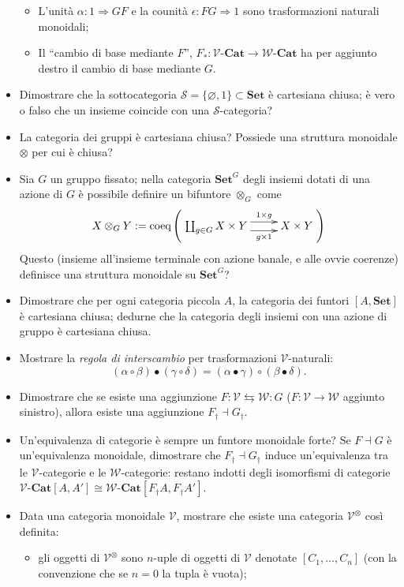 \documentclass[a4paper,10pt]{amsart}
\def\V{\mathcal{V}}
\def\VCat{\V\text{-}\mathbf{Cat}}
\def\Cat{\mathbf{Cat}}
\begin{document}
\begin{itemize}
\begin{itemize}
		\item L'unità $\alpha : 1\Rightarrow GF$ e la counità $\epsilon : FG \Rightarrow 1$ sono trasformazioni naturali monoidali;
		\item Il ``cambio di base mediante $F$'', $F_* : \VCat \to \mathcal{W}\text{-}\Cat$ ha per aggiunto destro il cambio di base mediante $G$.
	\end{itemize}
	\item Dimostrare che la sottocategoria $\mathcal S = \{\varnothing, 1\}\subset\mathbf{Set}$ è cartesiana chiusa; è vero o falso che un insieme coincide con una $\mathcal S$-categoria?
	\item La categoria dei gruppi è cartesiana chiusa? Possiede una struttura monoidale $\otimes$ per cui è chiusa?
	\item Sia $G$ un gruppo fissato; nella categoria $\mathbf{Set}^G$ degli insiemi dotati di una azione di $G$ è possibile definire un bifuntore $\otimes_G$ come
	\[X\otimes_G Y := \text{coeq}\left( \xymatrix{\coprod_{g\in G} X\times Y \ar@<4pt>[r]^-{1\times g}\ar@<-4pt>[r]_-{g\times 1} & X\times Y}\right)
	\]
	Questo (insieme all'insieme terminale con azione banale, e alle ovvie coerenze) definisce una struttura monoidale su $\mathbf{Set}^G$?
	\item Dimostrare che per ogni categoria piccola $A$, la categoria dei funtori $[A,\mathbf{Set}]$ è cartesiana chiusa; dedurne che la categoria degli insiemi con una azione di gruppo è cartesiana chiusa. 
	\item Mostrare la \emph{regola di interscambio} per trasformazioni $\V$-naturali:
	\[(\alpha\circ\beta)\bullet(\gamma\circ\delta) = (\alpha\bullet\gamma)\circ(\beta\bullet\delta).\]
	\item Dimostrare che se esiste una aggiunzione $F : \mathcal V\leftrightarrows \mathcal W :  G$ ($F : \mathcal V\to \mathcal W$ aggiunto sinistro), allora esiste una aggiunzione $F_\dag\dashv G_\dag$.
	\item Un'equivalenza di categorie è sempre un funtore monoidale forte? Se $F\dashv G$ è un'equivalenza monoidale, dimostrare che $F_\dag\dashv G_\dag$ induce un'equivalenza tra le $\mathcal V$-categorie e le $\mathcal W$-categorie: restano indotti degli isomorfismi di categorie $\mathcal V\text{-}\mathbf{Cat}[A,A']\cong \mathcal W\text{-}\mathbf{Cat}[F_\dag A, F_\dag A']$.
	\item Data una categoria monoidale $\V$, mostrare che esiste una categoria $\V^\otimes$ così definita:
	\begin{itemize}
		\item gli oggetti di $\V^\otimes$ sono $n$-uple di oggetti di $\V$ denotate $[C_1,\dots,C_n]$ (con la convenzione che se $n=0$ la tupla è vuota);

\end{itemize}
\end{itemize}
\end{document}
